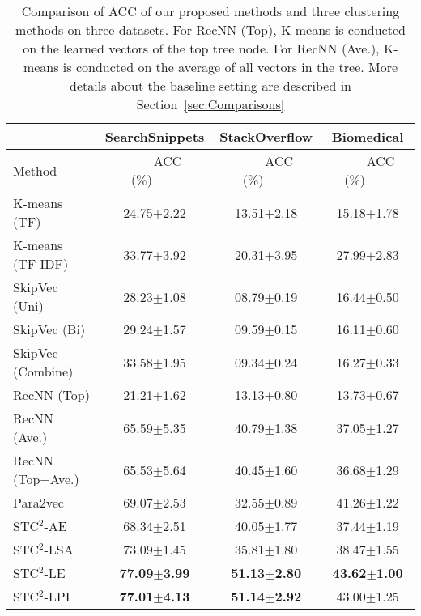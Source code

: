 \documentclass[review]{elsarticle}
\begin{document}
\begin{table*}[t] \begin{center}
\begin{tabular}{|l|c|c|c|}\hline
&SearchSnippets &StackOverflow &Biomedical\\\hline
Method     &~~~~ACC (\%)~~~~&~~~~ACC (\%)~~~~&~~~~ACC (\%)~~~~\\\hline \hline
K-means (TF)& 24.75$\pm$2.22        & 13.51$\pm$2.18  & 15.18$\pm$1.78    \\
K-means (TF-IDF)& 33.77$\pm$3.92    & 20.31$\pm$3.95  & 27.99$\pm$2.83 \\
SkipVec (Uni) & 28.23$\pm$1.08           & 08.79$\pm$0.19  & 16.44$\pm$0.50 \\
SkipVec (Bi)  & 29.24$\pm$1.57           & 09.59$\pm$0.15  & 16.11$\pm$0.60 \\
SkipVec (Combine)  & 33.58$\pm$1.95      & 09.34$\pm$0.24  & 16.27$\pm$0.33 \\
RecNN (Top) & 21.21$\pm$1.62     	&13.13$\pm$0.80	  &13.73$\pm$0.67\\
RecNN (Ave.) & 65.59$\pm$5.35		&40.79$\pm$1.38	  &37.05$\pm$1.27\\
RecNN (Top+Ave.) & 65.53$\pm$5.64	&40.45$\pm$1.60	  &36.68$\pm$1.29\\
Para2vec & 69.07$\pm$2.53	&32.55$\pm$0.89	  &41.26$\pm$1.22\\
\hline
STC$^2$-AE& 68.34$\pm$2.51& 40.05$\pm$1.77	  &37.44$\pm$1.19\\
STC$^2$-LSA& 73.09$\pm$1.45	& 35.81$\pm$1.80	   &38.47$\pm$1.55\\
STC$^2$-LE& {\bf{77.09$\pm$3.99}} & {\bf{51.13$\pm$2.80}}	     &{\bf{43.62$\pm$1.00}}\\
STC$^2$-LPI& {\bf{77.01$\pm$4.13}}	& {\bf{51.14$\pm$2.92}}	&43.00$\pm$1.25\\\hline

\end{tabular}
\end{center}
\caption{\label{tb:Comparison} Comparison of ACC of our proposed methods and three clustering methods on three datasets. For RecNN (Top), K-means is conducted on the learned vectors of the top tree node. For RecNN (Ave.), K-means is conducted on the average of all vectors in the tree. More details about the baseline setting are described in Section~\ref{sec:Comparisons}}
\end{table*}
\end{document}
